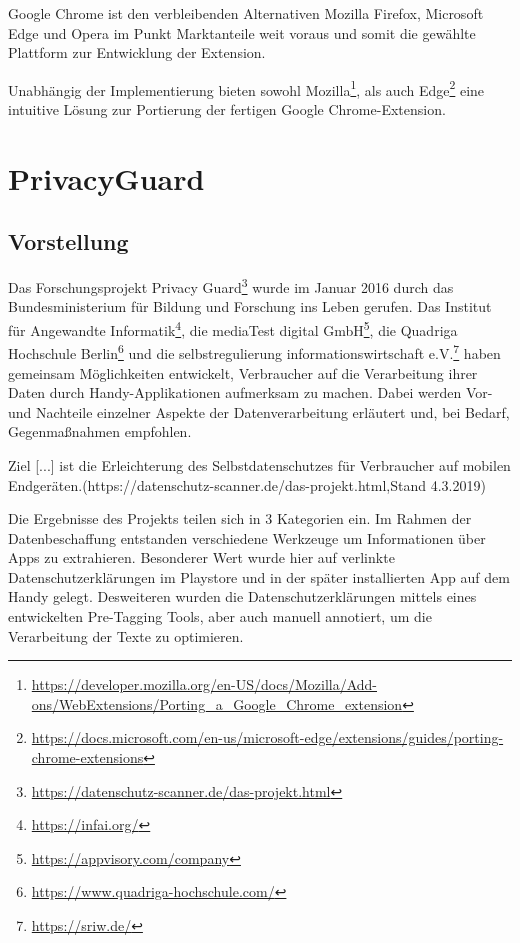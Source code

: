 Google Chrome ist den verbleibenden Alternativen Mozilla Firefox, Microsoft Edge und Opera im Punkt Marktanteile weit voraus und somit die gewählte Plattform zur Entwicklung der Extension.

Unabhängig der Implementierung bieten sowohl Mozilla\footnote{\url{https://developer.mozilla.org/en-US/docs/Mozilla/Add-ons/WebExtensions/Porting_a_Google_Chrome_extension}}, als auch Edge\footnote{\url{https://docs.microsoft.com/en-us/microsoft-edge/extensions/guides/porting-chrome-extensions}} eine intuitive Lösung zur Portierung der fertigen Google Chrome-Extension.

\section{PrivacyGuard}
\label{s:pguard}

\subsection{Vorstellung}
\label{ss:vorstellung}
Das Forschungsprojekt Privacy Guard\footnote{\url{https://datenschutz-scanner.de/das-projekt.html}} wurde im Januar 2016 durch das Bundesministerium für Bildung und Forschung ins Leben gerufen. Das Institut für Angewandte Informatik\footnote{\url{https://infai.org/}}, die mediaTest digital GmbH\footnote{\url{https://appvisory.com/company}}, die Quadriga Hochschule Berlin\footnote{\url{https://www.quadriga-hochschule.com/}} und die selbstregulierung informationswirtschaft e.V.\footnote{\url{https://sriw.de/}} haben gemeinsam Möglichkeiten entwickelt, Verbraucher auf die Verarbeitung ihrer Daten durch Handy-Applikationen aufmerksam zu machen. Dabei werden Vor- und Nachteile einzelner Aspekte der Datenverarbeitung erläutert und, bei Bedarf, Gegenmaßnahmen empfohlen.

\glqq Ziel [...] ist die Erleichterung des Selbstdatenschutzes für Verbraucher auf mobilen Endgeräten.\grqq{}(https://datenschutz-scanner.de/das-projekt.html,Stand 4.3.2019)

Die Ergebnisse des Projekts teilen sich in 3 Kategorien ein. Im Rahmen der Datenbeschaffung entstanden verschiedene Werkzeuge um Informationen über Apps zu extrahieren. Besonderer Wert wurde hier auf verlinkte Datenschutzerklärungen im Playstore und in der später installierten App auf dem Handy gelegt. Desweiteren wurden die Datenschutzerklärungen mittels eines entwickelten Pre-Tagging Tools, aber auch manuell annotiert, um die Verarbeitung der Texte zu optimieren.


